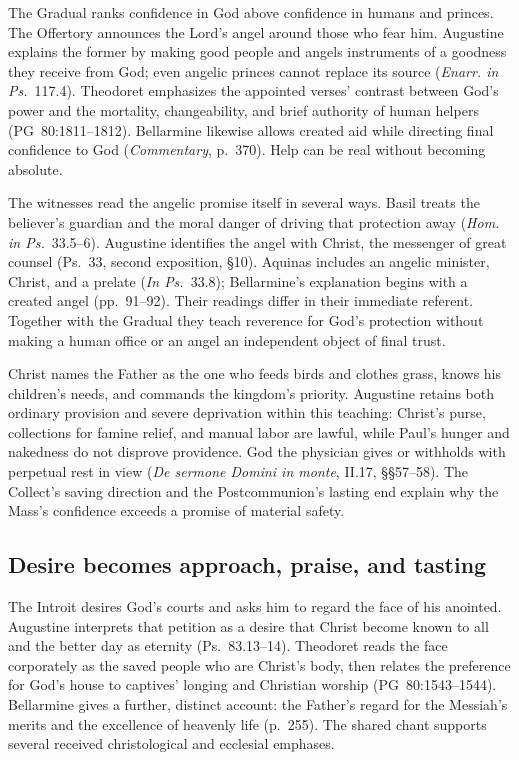 The Gradual ranks confidence in God above confidence in humans and princes.
The Offertory announces the Lord's angel around those who fear him. Augustine
explains the former by making good people and angels instruments of a goodness
they receive from God; even angelic princes cannot replace its source
(\emph{Enarr. in Ps.}~117.4). Theodoret emphasizes the appointed verses'
contrast between God's power and the mortality, changeability, and brief
authority of human helpers (PG~80:1811--1812). Bellarmine likewise allows
created aid while directing final confidence to God (\emph{Commentary},
p.~370). Help can be real without becoming absolute.

The witnesses read the angelic promise itself in several ways. Basil treats
the believer's guardian and the moral danger of driving that protection away
(\emph{Hom. in Ps.}~33.5--6). Augustine identifies the angel with Christ, the
messenger of great counsel (Ps.~33, second exposition, §10). Aquinas includes
an angelic minister, Christ, and a prelate (\emph{In Ps.}~33.8); Bellarmine's
explanation begins with a created angel (pp.~91--92). Their readings
differ in their immediate referent. Together with the Gradual they teach
reverence for God's protection without making a human office or an angel an
independent object of final trust.

Christ names the Father as the one who feeds birds and clothes grass, knows
his children's needs, and commands the kingdom's priority. Augustine retains
both ordinary provision and severe deprivation within this teaching: Christ's
purse, collections for famine relief, and manual labor are lawful, while
Paul's hunger and nakedness do not disprove providence. God the physician
gives or withholds with perpetual rest in view (\emph{De sermone Domini in monte},
II.17, §§57--58). The Collect's saving direction and the Postcommunion's lasting
end explain why the Mass's confidence exceeds a promise of material safety.

\subsection*{Desire becomes approach, praise, and tasting\enspace{}}

The Introit desires God's courts and asks him to regard the face of his
anointed. Augustine interprets that petition as a desire that Christ become
known to all and the better day as eternity (Ps.~83.13--14). Theodoret reads
the face corporately as the saved people who are Christ's body, then relates
the preference for God's house to captives' longing and Christian worship
(PG~80:1543--1544). Bellarmine gives a further, distinct account: the Father's
regard for the Messiah's merits and the excellence of heavenly life
(p.~255). The shared chant supports several received christological
and ecclesial emphases.

